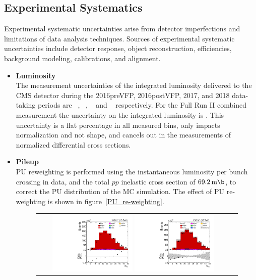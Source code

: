 \begin{refsection}
\subsection{Experimental Systematics}
\label{Experimental_Systematics}
Experimental systematic uncertainties arise from detector imperfections and limitations of data analysis techniques.
Sources of experimental systematic uncertainties include detector response, object reconstruction, efficiencies, background modeling, calibrations, and alignment.
\begin{itemize}
    \item {\bf Luminosity} \\
    The measurement uncertainties of the integrated luminosity delivered to the CMS detector during the 2016preVFP, 2016postVFP, 2017, and 2018 data-taking periods are \lumierrSixPreVFP~\cite{bib:lumipas16}, \lumierrSixPostVFP~\cite{bib:lumipas16}, \lumierrSeven~\cite{bib:lumipas17} and \lumierrEight~\cite{bib:lumipas18} respectively. 
    For the Full Run II combined measurement the uncertainty on the integrated luminosity is \lumierrRuniiUL.
    This uncertainty is a flat percentage in all measured bins, only impacts normalization and not shape, and cancels out in the measurements of normalized differential cross sections.
    \item {\bf Pileup} \\
    PU reweighting is performed using the instantaneous luminosity per bunch crossing in data, and the total $pp$ inelastic cross section of $\SI{69.2}{\m \b}$, to correct the PU distribution of the MC simulation.
    The effect of PU re-weighting is shown in figure~\ref{PU_re-weighting}.
    \begin{figure}[htb]
    \begin{center}
        \begin{tabular}{cc}
            \includegraphics[width=0.425\textwidth]{fig_fullRun2UL/controlplots/combined/vertMulti_noPU_step8.pdf}
            \includegraphics[width=0.425\textwidth]{fig_fullRun2UL/controlplots/combined/vertMulti_step8.pdf}

\end{tabular}
\end{center}
\end{figure}
\end{itemize}
\end{refsection}
